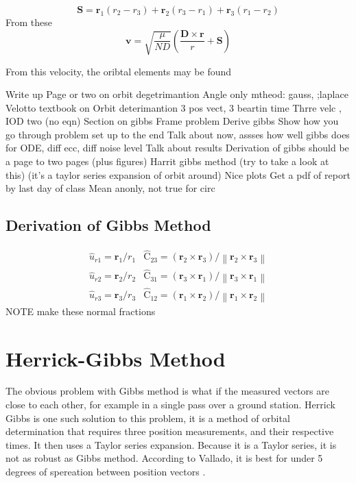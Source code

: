 \documentclass[12pt]{article}
\begin{document}
	\begin{equation}
	\mathbf { S } = \mathbf { r } _ { 1 } \left( r _ { 2 } - r _ { 3 } \right) + \mathbf { r } _ { 2 } \left( r _ { 3 } - r _ { 1 } \right) + \mathbf { r } _ { 3 } \left( r _ { 1 } - r _ { 2 } \right)
	\end{equation}
	From these
	\begin{equation}
	\mathbf { v } = \sqrt { \frac { \mu } { N D } } \left( \frac { \mathbf { D } \times \mathbf { r } } { r } + \mathbf { S } \right)
	\end{equation}
	
	From this velocity, the oribtal elements may be found
	
	
	Write up
	Page or two on orbit degetrimantion
	Angle only mtheod: gauss, ;laplace
	Velotto textbook on Orbit deterimantion
	3 pos vect, 3 beartin time
	Thrre velc , IOD two
	(no eqn)
	Section on gibbs
	Frame problem
	Derive gibbs
	Show how you go through problem set up to the end
	Talk about now, assses how well gibbs does for ODE, diff ecc, diff noise level
	Talk about results
	Derivation of gibbs should be a page to two pages (plus figures)
	Harrit gibbs method (try to take a look at this) (it’s a taylor series expansion of orbit around)
	Nice plots
	Get a pdf of report by last day of class
	Mean  anonly, not true for circ
	
	
	\subsection{Derivation of Gibbs Method}
	\begin{eqnarray}
	\hat { { u } } _ { r 1 } = \mathbf { r } _ { 1 } / r _ { 1 }& \hat { \mathrm { C } } _ { 23 } = \left( \mathbf { r } _ { 2 } \times \mathbf { r } _ { 3 } \right) / \left\| \mathbf { r } _ { 2 } \times \mathbf { r } _ { 3 } \right\|\\
	\hat {{ u } } _ { r 2 } = \mathbf { r } _ { 2 } / r _ { 2 }&\hat { \mathrm { C } } _ { 31 } = \left( \mathbf { r } _ { 3 } \times \mathbf { r } _ { 1} \right) / \left\| \mathbf { r } _ { 3 } \times \mathbf { r } _ { 1 } \right\|\\
		\hat {{ u } } _ { r 3 } = \mathbf { r } _ { 3 } / r _ { 3} & \hat { \mathrm { C } } _ { 12 } = \left( \mathbf { r } _ { 1 } \times \mathbf { r } _ { 2 } \right) / \left\| \mathbf { r } _ { 1} \times \mathbf { r } _ { 2 } \right\|
	\end{eqnarray}
	NOTE make these normal fractions
	\fi
	\section{Herrick-Gibbs Method}
	The obvious problem with Gibbs method is what if the measured vectors are close to each other, for example in a single pass over a ground station. Herrick Gibbs is one such solution to this problem, it is a method of orbital determination that requires three position measurements, and their respective times. It then uses a Taylor series expansion. Because it is a Taylor series, it is not as robust as Gibbs method. According to Vallado, it is best for under 5 degrees of spereation between position vectors \cite{vallado2007fundamentals}.
	
\end{document}
